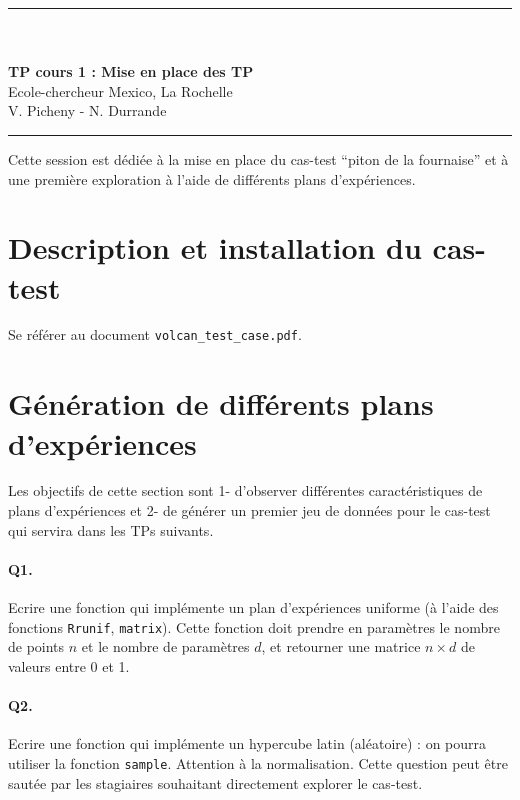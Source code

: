 \documentclass[12pt]{scrartcl}
\newcommand{\R}{\texttt{R}}
\begin{document}
\begin{center}
	\rule{\textwidth}{1pt}
	\\ \ \\
	{\LARGE \textbf{TP cours 1 : Mise en place des TP}}\\
	\vspace{3mm}
	{\large Ecole-chercheur Mexico, La Rochelle \\ \vspace{3mm}}
	{\normalsize V. Picheny - N. Durrande}\\
	\vspace{3mm}
	\rule{\textwidth}{1pt}
	\vspace{5mm}
\end{center}
Cette session est dédiée à la mise en place du cas-test ``piton de la fournaise'' et à une première exploration à l'aide de différents plans d'expériences.

\section{Description et installation du cas-test}
Se référer au document \texttt{volcan\_test\_case.pdf}.

\section{Génération de différents plans d'expériences}

Les objectifs de cette section sont 1- d'observer différentes caractéristiques de plans d'expériences et 2- de générer un premier jeu de données pour le cas-test qui servira dans les TPs suivants.

\paragraph{Q1.} Ecrire une fonction qui implémente un plan d'expériences uniforme (à l'aide des fonctions \R \texttt{runif}, \texttt{matrix}). 
Cette fonction doit prendre en paramètres le nombre de points $n$ et le nombre de paramètres $d$, et retourner une matrice $n \times d$ de valeurs entre 0 et 1.

\paragraph{Q2.} Ecrire une fonction qui implémente un hypercube latin (aléatoire) : on pourra utiliser la fonction \texttt{sample}. Attention à la normalisation.
Cette question peut être sautée par les stagiaires souhaitant directement explorer le cas-test.
\end{document}
